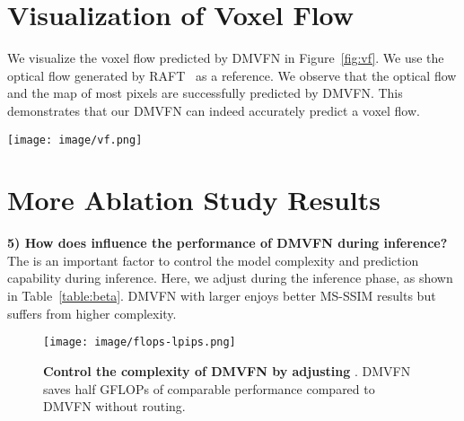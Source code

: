 \documentclass[10pt,twocolumn,letterpaper]{article}
\begin{document}
\section{Visualization of Voxel Flow}
We visualize the voxel flow predicted by DMVFN in Figure~\ref{fig:vf}.
We use the optical flow generated by RAFT~\cite{raft} as a reference.
We observe that the optical flow  and the map  of most pixels are successfully predicted by DMVFN.
This demonstrates that our DMVFN can indeed accurately predict a voxel flow.
\label{sec:vf}
\begin{figure*}[h]
\vspace{4mm}
	\centering
	\texttt{[image: image/vf.png]}
 \caption{\textbf{Visualization} of the map , the optical flow , the optical flow by RAFT~\cite{raft} , the predicted frame  and the “ground truth” .}
        \label{fig:vf}
	\vspace{-2mm}
\end{figure*}


\section{More Ablation Study Results}
\label{sec:more_ab}


\noindent
\textbf{5) How does  influence the performance of DMVFN during inference?} The  is an important factor to control the model complexity and prediction capability during inference. Here, we adjust  during the inference phase, as shown in Table~\ref{table:beta}. DMVFN with larger  enjoys better MS-SSIM results but suffers from higher complexity.

\begin{table}[th]
\caption{\textbf{Results of DMVFN with different }\ evaluated on KITTI benchmark~\cite{kitti}.}
\centering
{}
\label{table:beta}
\end{table}

\begin{figure}[th]
 	\centering
 \texttt{[image: image/flops-lpips.png]}
\caption{\textbf{Control the complexity of DMVFN by adjusting }. DMVFN saves half GFLOPs of comparable performance compared to DMVFN without routing.}
 	\label{fig:flops}
 \end{figure}
\end{document}
